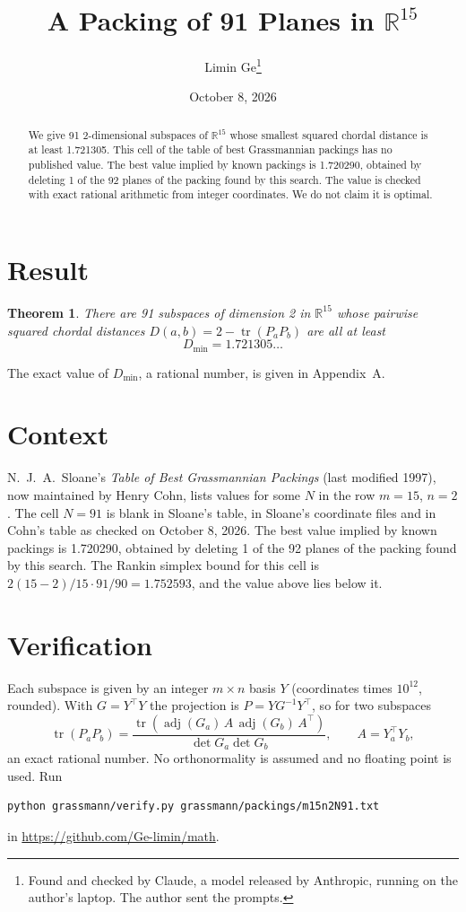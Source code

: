 \documentclass[11pt,a4paper]{article}
\title{A Packing of 91 Planes in $\mathbb{R}^{15}$}
\author{Limin Ge\thanks{Found and checked by Claude, a model released by Anthropic, running on the author's laptop. The author sent the prompts.}}
\date{October 8, 2026}
\newtheorem*{theorem}{Theorem}
\begin{document}
\maketitle
\begin{abstract}
We give 91 2-dimensional subspaces of $\mathbb{R}^{15}$ whose smallest squared chordal distance is at least 1.721305. This cell of the table of best Grassmannian packings has no published value. The best value implied by known packings is 1.720290, obtained by deleting 1 of the 92 planes of the packing found by this search. The value is checked with exact rational arithmetic from integer coordinates. We do not claim it is optimal.
\end{abstract}

\section{Result}
\begin{theorem}
There are 91 subspaces of dimension 2 in $\mathbb{R}^{15}$ whose pairwise squared chordal distances $D(a,b) = 2 - \operatorname{tr}(P_aP_b)$ are all at least
\[ D_{\min} = 1.721305\ldots \]
\end{theorem}
The exact value of $D_{\min}$, a rational number, is given in Appendix~A.


\section{Context}
N.~J.~A.~Sloane's \emph{Table of Best Grassmannian Packings} (last modified 1997), now maintained by Henry Cohn, lists values for some $N$ in the row $m=15$, $n=2$. The cell $N=91$ is blank in Sloane's table, in Sloane's coordinate files and in Cohn's table as checked on October 8, 2026. The best value implied by known packings is 1.720290, obtained by deleting 1 of the 92 planes of the packing found by this search. The Rankin simplex bound for this cell is $2(15-2)/15\cdot 91/90 = 1.752593$, and the value above lies below it.


\section{Verification}
Each subspace is given by an integer $m\times n$ basis $Y$ (coordinates times $10^{12}$, rounded). With $G=Y^\top Y$ the projection is $P=YG^{-1}Y^\top$, so for two subspaces
\[ \operatorname{tr}(P_aP_b)=\frac{\operatorname{tr}(\operatorname{adj}(G_a)\,A\,\operatorname{adj}(G_b)\,A^\top)}{\det G_a\det G_b},\qquad A=Y_a^\top Y_b, \]
an exact rational number. No orthonormality is assumed and no floating point is used. Run
\begin{verbatim}
python grassmann/verify.py grassmann/packings/m15n2N91.txt
\end{verbatim}
in \url{https://github.com/Ge-limin/math}.
\end{document}
